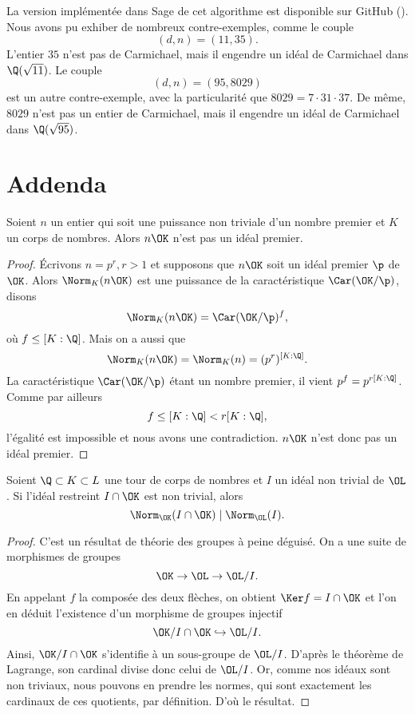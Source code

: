 \documentclass[a4paper, 12pt, oneside]{article}
\begin{document}
\begin{algorithm}[H]
\end{algorithm}

\vspace{1em}
La version implémentée dans Sage de cet algorithme est disponible sur GitHub (). Nous avons pu exhiber de nombreux contre-exemples, comme le couple $$(d, n) = (11, 35).$$ L'entier $35$ n'est pas de Carmichael, mais il engendre un idéal de Carmichael dans $\Q(\sqrt{11})$. Le couple $$(d, n) = (95,8029)$$ est un autre contre-exemple, avec la particularité que $8029 = 7\cdot 31\cdot 37$. De même, $8029$ n'est pas un entier de Carmichael, mais il engendre un idéal de Carmichael dans $\Q(\sqrt{95})$.

\section*{Addenda}

\begin{fait*}
Soient $n$ un entier qui soit une puissance non triviale d'un nombre premier et $ K$ un corps de nombres. Alors $n\OK$ n'est pas un idéal premier.
\end{fait*}

\begin{proof}
Écrivons $n = p^r, r>1$ et supposons que $n\OK$ soit un idéal premier $\p$ de $\OK$. Alors $\Norm_K(n\OK)$ est une puissance de la caractéristique $\Car(\OK/\p)$, disons $$\Norm_K(n\OK) = \Car(\OK/\p)^f,$$ où $f \leq [K : \Q]$. Mais on a aussi que $$\Norm_K(n\OK) = \Norm_K(n) = (p^r)^{[K : \Q]}.$$ La caractéristique $\Car(\OK/\p)$ étant un nombre premier, il vient $p^f = p^{r[K : \Q]}$. Comme par ailleurs $$f \leq [K : \Q] < r[K : \Q],$$ l'égalité est impossible et nous avons une contradiction. $n\OK$ n'est donc pas un idéal premier.
\end{proof}

\begin{fait*}
	Soient $\Q\subset K \subset L$ une tour de corps de nombres et $I$ un idéal non trivial de $\OL$. Si l'idéal restreint $I\cap \OK$ est non trivial, alors $$\Norm_{\OK}(I \cap \OK) \mid \Norm_{\OL}(I).$$
\end{fait*}

\begin{proof}
C'est un résultat de théorie des groupes à peine déguisé. On a une suite de morphismes de groupes $$\OK\to \OL \to \OL/I.$$ En appelant $f$ la composée des deux flèches, on obtient $\Ker f = I\cap \OK$ et l'on en déduit l'existence d'un morphisme de groupes injectif $$\OK/I\cap \OK \hookrightarrow \OL/I.$$ Ainsi, $\OK/ I\cap \OK$ s'identifie à un sous-groupe de $\OL/I$. D'après le théorème de Lagrange, son cardinal divise donc celui de $\OL/I$. Or, comme nos idéaux sont non triviaux, nous pouvons en prendre les normes, qui sont exactement les cardinaux de ces quotients, par définition. D'où le résultat.
\end{proof}
\end{document}
